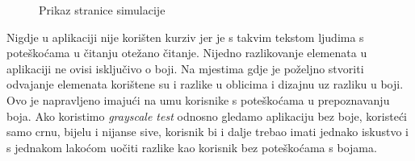 \documentclass[times, utf8, zavrsni, numeric]{fer}
\begin{document}
    \begin{figure} [H]
      \centering
      \caption{Prikaz stranice simulacije}
    \end{figure}
    
    Nigdje u aplikaciji nije korišten kurziv jer je s takvim tekstom ljudima s poteškoćama u čitanju otežano čitanje. Nijedno razlikovanje elemenata u aplikaciji ne ovisi isključivo o boji. Na mjestima gdje je poželjno stvoriti odvajanje elemenata korištene su i razlike u oblicima i dizajnu uz razliku u boji. Ovo je napravljeno imajući na umu korisnike s poteškoćama u prepoznavanju boja. Ako koristimo \textit{grayscale test} odnosno gledamo aplikaciju bez boje, koristeći samo crnu, bijelu i nijanse sive, korisnik bi i dalje trebao imati jednako iskustvo i s jednakom lakoćom uočiti razlike kao korisnik bez poteškoćama s bojama.
    
\end{document}
